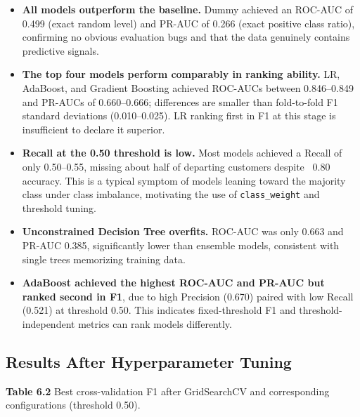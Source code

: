 \begin{itemize}
    \item \textbf{All models outperform the baseline.} Dummy achieved an ROC-AUC of 0.499 (exact random level) and PR-AUC of 0.266 (exact positive class ratio), confirming no obvious evaluation bugs and that the data genuinely contains predictive signals.
    \item \textbf{The top four models perform comparably in ranking ability.} LR, AdaBoost, and Gradient Boosting achieved ROC-AUCs between 0.846–0.849 and PR-AUCs of 0.660–0.666; differences are smaller than fold-to-fold F1 standard deviations (0.010–0.025). LR ranking first in F1 at this stage is insufficient to declare it superior.
    \item \textbf{Recall at the 0.50 threshold is low.} Most models achieved a Recall of only 0.50–0.55, missing about half of departing customers despite ~0.80 accuracy. This is a typical symptom of models leaning toward the majority class under class imbalance, motivating the use of \texttt{class\_weight} and threshold tuning.
    \item \textbf{Unconstrained Decision Tree overfits.} ROC-AUC was only 0.663 and PR-AUC 0.385, significantly lower than ensemble models, consistent with single trees memorizing training data.
    \item \textbf{AdaBoost achieved the highest ROC-AUC and PR-AUC but ranked second in F1}, due to high Precision (0.670) paired with low Recall (0.521) at threshold 0.50. This indicates fixed-threshold F1 and threshold-independent metrics can rank models differently.
\end{itemize}

\subsection{ Results After Hyperparameter Tuning}

\noindent\textbf{Table 6.2} Best cross-validation F1 after GridSearchCV and corresponding configurations (threshold 0.50).

